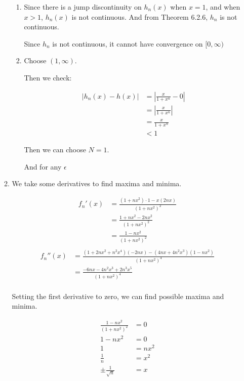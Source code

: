 \documentclass[12pt,letterpaper]{article}
\begin{document}
\begin{enumerate}
\begin{enumerate}
\begin{enumerate}
            \item
              Since there is a jump discontinuity on $h_n(x)$ when $x = 1$, and when $x > 1$,
              $h_n(x)$ is not continuous.
              And from Theorem 6.2.6, $h_n$ is not continuous.

              Since $h_n$ is not continuous, it cannot have convergence on $[0, \infty)$
            \item
              Choose $(1, \infty)$.

              Then we check:

              \begin{align*}
                \left| h_n(x) - h(x) \right|
                &= \left| \frac{x}{1 + x^n} - 0 \right| \\
                &= \left| \frac{x}{1 + x^n} \right| \\
                &= \frac{x}{1 + x^n} \\
                &< 1
              \end{align*}

              Then we can choose $N = 1$.

              And for any $\epsilon$
          \end{enumerate}
        \item
          We take some derivatives to find maxima and minima.

          \begin{align*}
            f_n'(x)
            &= \frac{\left(1 + nx^2\right) \cdot 1 - x (2nx)}{\left(1 + nx^2\right)^2}\\
            &= \frac{1 + nx^2 - 2nx^2}{\left(1 + nx^2\right)^2}\\
            &= \frac{1 - nx^2}{\left(1 + nx^2\right)^2}\\
          \end{align*}
          \begin{align*}
            f_n''(x)
            &= \frac{\left(1 + 2nx^2 + n^2x^4\right)\left(-2nx\right) - \left(4nx + 4n^2x^3\right)\left(1 - nx^2\right)}{\left(1 + nx^2\right)^4} \\
            &= \frac{-6nx - 4n^2x^3 + 2n^3x^5}{\left(1 + nx^2\right)^4} \\
          \end{align*}

          Setting the first derivative to zero, we can find possible maxima and minima.

          \begin{align*}
            \frac{1 - nx^2}{\left(1 + nx^2\right)^2} &= 0 \\
            1 - nx^2 &= 0 \\
            1 &= nx^2 \\
            \frac{1}{n} &= x^2 \\
            \pm\frac{1}{\sqrt{n}} &= x \\
          \end{align*}


\end{enumerate}
\end{enumerate}
\end{document}
